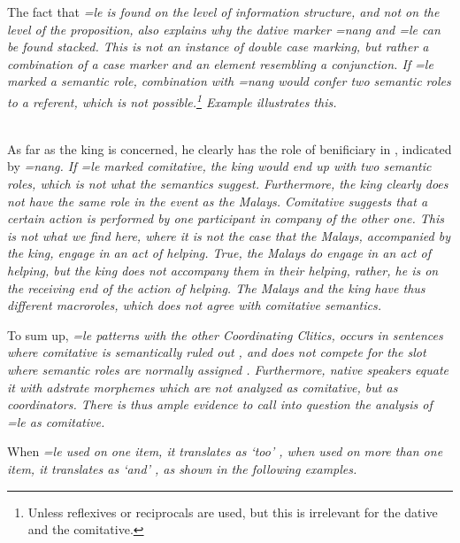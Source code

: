 The fact that \em =le \em is found on the level of information structure, and not on the level of the proposition,  also explains why the dative marker \em =nang \em and \em =le \em can be found stacked. This is not an instance of double case marking, but rather a combination of a case marker and an element resembling a conjunction. If \em =le \em marked a semantic role, combination with \em =nang \em would confer two semantic roles to a referent, which is not possible.\footnote{Unless reflexives or reciprocals are used, but this is irrelevant for the dative and the comitative.} Example  illustrates this.
 
 \\
As far as the king is concerned, he clearly has the role of benificiary in , indicated by \em =nang\em. If \em =le \em marked comitative, the king would end up with two semantic roles, which is not what the semantics suggest. Furthermore, the king clearly does not have the same role in the event as the Malays. Comitative suggests that a certain action is performed by one participant in company of the other one. This is not what we find here, where it is not the case that the Malays, accompanied by the king, engage in an act of helping. True, the Malays do engage in an act of helping, but the king does not accompany them in their helping, rather, he is on the receiving end of the action of helping. The Malays and the king have thus different macroroles, which does not agree with comitative semantics.

To sum up, \em =le \em patterns with the other Coordinating Clitics, occurs in sentences where comitative is semantically ruled out , and does not compete for the slot where semantic roles are normally assigned . Furthermore, native speakers equate it with adstrate morphemes which are not analyzed as comitative, but as coordinators. There is thus ample evidence to call into question the analysis of \em =le \em as comitative.

When \em =le \em used on one item, it translates as `too' , when used on more than one item, it translates as `and' , as shown in the following examples.
 

